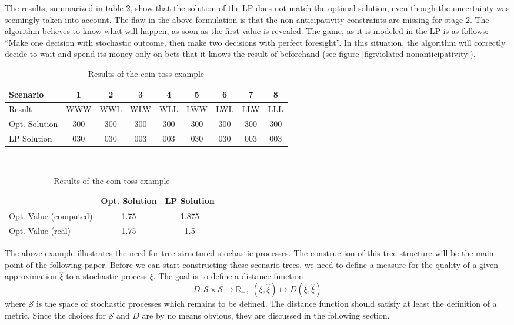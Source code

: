 \begin{example}
  The results, summarized in table \ref{tab:coin-toss-results}, show that the solution of the LP does not match the optimal solution, even though the uncertainty was seemingly taken into account. 
  The flaw in the above formulation is that the non-anticipativity constraints are missing for stage 2. 
  The algorithm believes to know what will happen, as soon as the first value is revealed. 
  The game, as it is modeled in the LP is as follows: 
  ``Make one decision with stochastic outcome, then make two decisions with perfect foresight''. 
  In this situation, the algorithm will correctly decide to wait and spend its money only on bets that it knows the result of beforehand (see figure \ref{fig:violated-nonanticipativity}). 
  
  \begin{table}
    \small\centering
    \begin{tabular}{lcccccccc}
      \hline 
      Scenario&1&2&3&4&5&6&7&8\\\hline\hline
      Result&WWW&WWL&WLW&WLL&LWW&LWL&LLW&LLL\\
      Opt. Solution&300&300&300&300&300&300&300&300\\
      LP Solution&030&030&003&003&030&030&003&003\\\hline
    \end{tabular}
    \vspace*{0.5cm}\\
    \begin{tabular}{lcc}
      \hline
      &Opt. Solution&LP Solution\\\hline\hline
      Opt. Value (computed)&1.75&1.875\\
      Opt. Value (real)&1.75&1.5\\
      \hline
    \end{tabular}
    \caption{Results of the coin-toss example}
    \label{tab:coin-toss-results}
  \end{table}
\end{example}

The above example illustrates the need for tree structured stochastic processes. The construction of this tree structure will be the main point of the following paper. Before we can start constructing these scenario trees, we need to define a measure for the quality of a given approximation $\hat{\xi}$ to a stochastic process $\xi$. The goal is to define a distance function 
\begin{equation}
  \label{eq:distance-function-intro}
  D:\mathcal{S} \times \mathcal{S} \rightarrow \mathbb{R}_+,\;(\xi, \hat{\xi})\mapsto D(\xi, \hat{\xi})
\end{equation}
where $\mathcal{S}$ is the space of stochastic processes which remains to be defined. The distance function should satisfy at least the definition of a metric. Since the choices for $\mathcal{S}$ and $D$ are by no means obvious, they are discussed in the following section.
